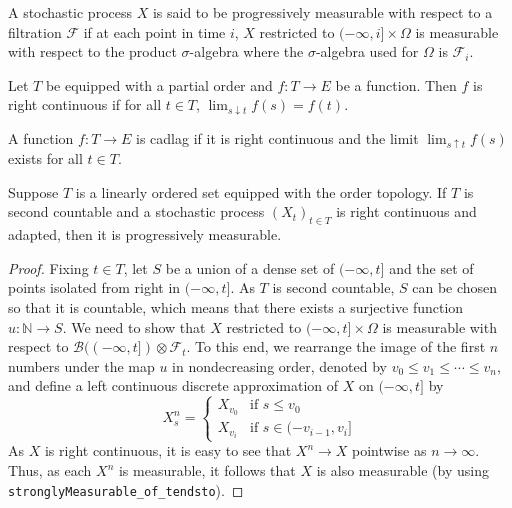 \begin{definition}\label{def:IsStronglyProgressive}
  \mathlibok
A stochastic process $X$ is said to be progressively measurable with respect to a filtration $\mathcal{F}$ if at each point in time $i$, $X$ restricted to $(-\infty, i] \times \Omega$ is measurable with respect to the product $\sigma$-algebra where the $\sigma$-algebra used for $\Omega$ is $\mathcal{F}_i$.
\end{definition}

\begin{definition}\label{def:RightContinuous}
  \leanok
  Let $T$ be equipped with a partial order and $f : T \to E$ be a function. Then $f$ is right
  continuous if for all $t \in T$, $\lim_{s \downarrow t} f(s) = f(t)$.
\end{definition}

\begin{definition}\label{def:IsCadlag}
  \leanok
  A function $f : T \to E$ is cadlag if it is right continuous and the limit $\lim_{s \uparrow t} f(s)$ exists for all $t \in T$.
\end{definition}


\begin{lemma}\label{lem:Adapted.isStronglyProgressive_of_rightContinuous}
  \leanok
Suppose $T$ is a linearly ordered set equipped with the order topology. If $T$ is second countable and a stochastic process $(X_t)_{t \in T}$ is right continuous and adapted, then it is progressively measurable.
\end{lemma}

\begin{proof}
  \leanok
  Fixing $t \in T$, let $S$ be a union of a dense set of $(-\infty,t]$ and the set of points isolated from right in $(-\infty,t]$.
  As $T$ is second countable, $S$ can be chosen so that it is countable, which means that there exists a surjective function $u: \mathbb{N} \rightarrow S$.
  We need to show that $X$ restricted to $(-\infty, t] \times \Omega$ is measurable with respect to $\mathcal{B}((-\infty, t]) \otimes \mathcal{F}_t$.
  To this end, we rearrange the image of the first $n$ numbers under the map $u$ in nondecreasing order, denoted by $v_0\le v_1\le \cdots\le v_n$,
  and define a left continuous discrete approximation of $X$ on $(-\infty, t]$ by
  $$X^n_s = \begin{cases}
    X_{v_0} & \text{if } s \le v_0 \\
    X_{v_i} & \text{if } s \in (- v_{i-1}, v_i]
  \end{cases}$$
  As $X$ is right continuous, it is easy to see that $X^n \to X$ pointwise as $n \to \infty$.
  Thus, as each $X^n$ is measurable, it follows that $X$ is also measurable (by using \verb|stronglyMeasurable_of_tendsto|).
\end{proof}



